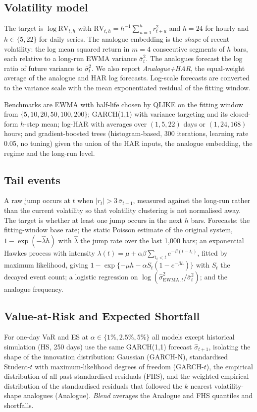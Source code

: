 \documentclass[preprint,12pt,authoryear]{elsarticle}
\begin{document}
\subsection{Volatility model}
The target is $\log \mathrm{RV}_{t,h}$ with $\mathrm{RV}_{t,h}=h^{-1}\sum_{u=1}^{h} r_{t+u}^2$ and
$h=24$ for hourly and $h\in\{5,22\}$ for daily series. The analogue embedding is the \emph{shape}
of recent volatility: the log mean squared return in $m=4$ consecutive segments of $h$ bars, each
relative to a long-run EWMA variance $\bar\sigma^2_t$. The analogues forecast the log ratio of
future variance to $\bar\sigma_t^2$. We also report \emph{Analogue+HAR}, the equal-weight average
of the analogue and HAR log forecasts. Log-scale forecasts are converted to the variance scale
with the mean exponentiated residual of the fitting window.

Benchmarks are EWMA \citep{riskmetrics1996} with half-life chosen by QLIKE on the fitting window
from $\{5,10,20,50,100,200\}$; GARCH(1,1) with variance targeting and its closed-form $h$-step
mean; log-HAR with averages over $(1, 5, 22)$ days or $(1, 24, 168)$ hours; and gradient-boosted
trees (histogram-based, 300 iterations, learning rate 0.05, no tuning) given the union of the HAR
inputs, the analogue embedding, the regime and the long-run level.

\subsection{Tail events}
A raw jump occurs at $t$ when $|r_t|>3\,\bar\sigma_{t-1}$, measured against the long-run rather
than the current volatility so that volatility clustering is not normalised away. The target is
whether at least one jump occurs in the next $h$ bars. Forecasts: the fitting-window base rate;
the static Poisson estimate of the original system, $1-\exp(-\hat\lambda h)$ with $\hat\lambda$ the
jump rate over the last 1,000 bars; an exponential Hawkes process with intensity
$\lambda(t)=\mu+\alpha\beta\sum_{t_i<t}e^{-\beta(t-t_i)}$, fitted by maximum likelihood, giving
$1-\exp\{-\mu h-\alpha S_t(1-e^{-\beta h})\}$ with $S_t$ the decayed event count; a logistic
regression on $\log(\hat\sigma^2_{\mathrm{EWMA},t}/\bar\sigma^2_t)$; and the analogue frequency.

\subsection{Value-at-Risk and Expected Shortfall}
For one-day VaR and ES at $\alpha\in\{1\%,2.5\%,5\%\}$ all models except historical simulation
(HS, 250 days) use the same GARCH(1,1) forecast $\hat\sigma_{t+1}$, isolating the shape of the
innovation distribution: Gaussian (GARCH-N), standardised Student-$t$ with maximum-likelihood
degrees of freedom (GARCH-$t$), the empirical distribution of all past standardised residuals
(FHS), and the weighted empirical distribution of the standardised residuals that followed the
$k$ nearest volatility-shape analogues (Analogue). \emph{Blend} averages the Analogue and FHS
quantiles and shortfalls.
\end{document}
